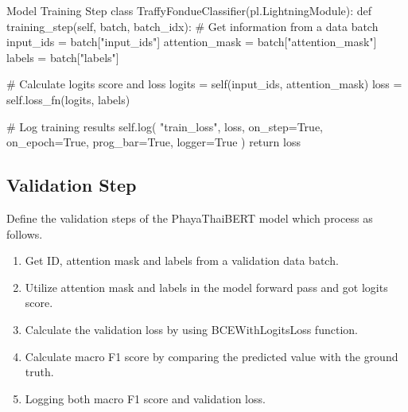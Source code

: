 \documentclass[12pt, a4paper]{article}
\begin{document}
                \begin{codeblock}{Model Training Step}
                    class TraffyFondueClassifier(pl.LightningModule):
                        def training_step(self, batch, batch_idx):
                            # Get information from a data batch
                            input_ids = batch["input_ids"]
                            attention_mask = batch["attention_mask"]
                            labels = batch["labels"]

                            # Calculate logits score and loss
                            logits = self(input_ids, attention_mask)
                            loss = self.loss_fn(logits, labels)

                            # Log training results
                            self.log(
                                "train_loss", loss, on_step=True, on_epoch=True, prog_bar=True, logger=True
                            )
                            return loss
                \end{codeblock}

    \pagebreak

            \subsection{Validation Step}
                \noindent Define the validation steps of the PhayaThaiBERT model which process as follows.
                \begin{enumerate}
                    \item Get ID, attention mask and labels from a validation data batch.
                    \item Utilize attention mask and labels in the model forward pass and got logits score.
                    \item Calculate the validation loss by using BCEWithLogitsLoss function.
                    \item Calculate macro F1 score by comparing the predicted value with the ground truth.
                    \item Logging both macro F1 score and validation loss.
                \end{enumerate}
\end{document}
